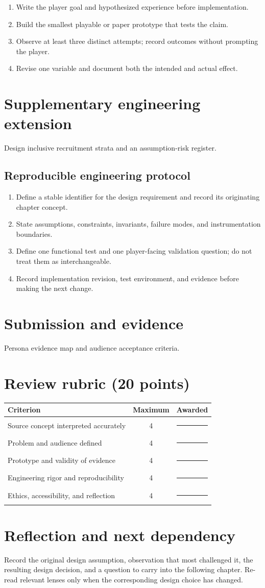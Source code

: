 \documentclass[11pt]{article}
\begin{document}
\begin{enumerate}
\item Write the player goal and hypothesized experience before implementation.
\item Build the smallest playable or paper prototype that tests the claim.
\item Observe at least three distinct attempts; record outcomes without prompting the player.
\item Revise one variable and document both the intended and actual effect.
\end{enumerate}

\section{Supplementary engineering extension}
Design inclusive recruitment strata and an assumption-risk register.


\subsection{Reproducible engineering protocol}
\begin{enumerate}
\item Define a stable identifier for the design requirement and record its originating chapter concept.
\item State assumptions, constraints, invariants, failure modes, and instrumentation boundaries.
\item Define one functional test and one player-facing validation question; do not treat them as interchangeable.
\item Record implementation revision, test environment, and evidence before making the next change.
\end{enumerate}

\section{Submission and evidence}
Persona evidence map and audience acceptance criteria.


\section{Review rubric (20 points)}
\begin{tabularx}{\linewidth}{@{}Xcc@{}}\toprule
Criterion & Maximum & Awarded \\ \midrule
Source concept interpreted accurately & 4 & \rule{0.45in}{0.4pt}\\
Problem and audience defined & 4 & \rule{0.45in}{0.4pt}\\
Prototype and validity of evidence & 4 & \rule{0.45in}{0.4pt}\\
Engineering rigor and reproducibility & 4 & \rule{0.45in}{0.4pt}\\
Ethics, accessibility, and reflection & 4 & \rule{0.45in}{0.4pt}\\\bottomrule
\end{tabularx}

\section{Reflection and next dependency}
Record the original design assumption, observation that most challenged it, the resulting design decision, and a question to carry into the following chapter. Re-read relevant lenses only when the corresponding design choice has changed.
\end{document}
